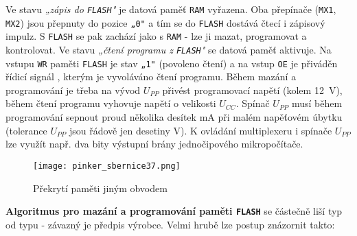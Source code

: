       Ve stavu \emph{„zápis do \texttt{FLASH}"} je datová paměť \texttt{RAM} vyřazena. Oba 
      přepínače (\texttt{MX1}, \texttt{MX2}) jsou přepnuty do pozice \texttt{„0"} a tím se do 
      \texttt{FLASH} dostává čtecí i zápisový impulz. S \texttt{FLASH} se pak zachází jako s 
      \texttt{RAM} - lze ji mazat, programovat a kontrolovat. Ve stavu \emph{„čtení programu z 
      \texttt{FLASH}"} se datová paměť aktivuje. Na vstupu \texttt{WR} paměti \texttt{FLASH} je 
      stav \texttt{„1"} (povoleno čtení) a na vstup \texttt{OE} je přiváděn řídicí signál 
      , kterým je vyvoláváno čtení programu. Během mazání a 
      programování je třeba na vývod \(U_{PP}\) přivést programovací napětí (kolem 
      \SI{12}{\volt}), během čtení programu vyhovuje napětí o velikosti \(U_{CC}\). Spínač 
      \(U_{PP}\) musí během programování sepnout proud několika desítek mA při malém napěťovém 
      úbytku (tolerance \(U_{PP}\) jsou řádově jen desetiny V). K ovládání multiplexeru i spínače 
      \(U_{PP}\) lze využít např. dva bity výstupní brány jednočipového mikropočítače.
      
      \begin{figure}[ht!] %
        \centering
        \texttt{[image: pinker\_sbernice37.png]}
        \caption{Překrytí paměti jiným obvodem}
        \label{MIT:fig_sbernice37}
      \end{figure}
      
      \textbf{Algoritmus pro mazání a programování paměti \texttt{FLASH}} se částečně liší typ od 
      typu - závazný je předpis výrobce. Velmi hrubě lze postup znázornit takto:
      
